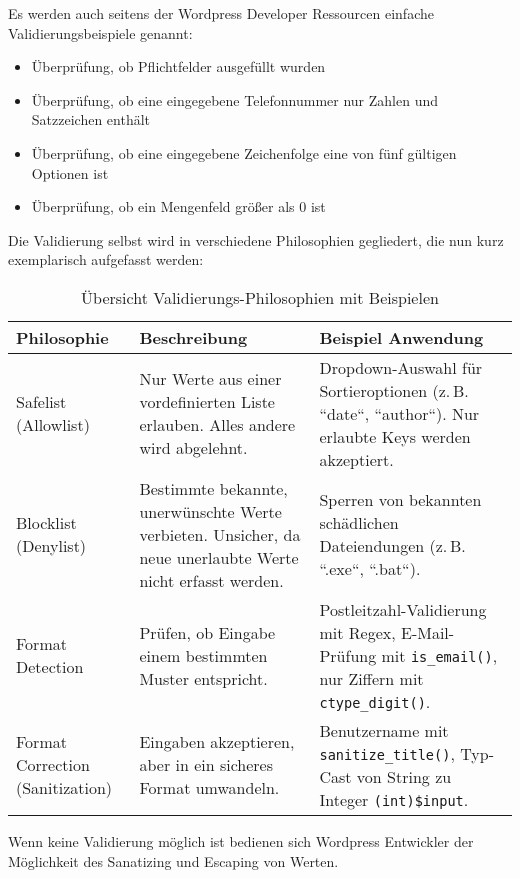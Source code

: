 Es werden auch seitens der Wordpress Developer Ressourcen einfache Validierungsbeispiele genannt:
\begin{itemize}
\item Überprüfung, ob Pflichtfelder ausgefüllt wurden
\item Überprüfung, ob eine eingegebene Telefonnummer nur Zahlen und Satzzeichen enthält
\item Überprüfung, ob eine eingegebene Zeichenfolge eine von fünf gültigen Optionen ist
\item Überprüfung, ob ein Mengenfeld größer als 0 ist
\end{itemize}
Die Validierung selbst wird in verschiedene Philosophien gegliedert, die nun kurz exemplarisch aufgefasst werden:
\begin{table}[h]
 \centering
 \renewcommand{\arraystretch}{1.3}
 \begin{tabular}{|p{3cm}|p{5cm}|p{6cm}|}
  \hline
  \textbf{Philosophie} & \textbf{Beschreibung} & \textbf{Beispiel Anwendung} \\
  \hline
  Safelist \newline (Allowlist)
  & Nur Werte aus einer vordefinierten Liste erlauben. Alles andere wird abgelehnt.
  & Dropdown-Auswahl für Sortieroptionen (z.\,B. ``date``, ``author``). Nur erlaubte Keys werden akzeptiert. \\
  \hline
  Blocklist \newline (Denylist)
  & Bestimmte bekannte, unerwünschte Werte verbieten. Unsicher, da neue unerlaubte Werte nicht erfasst werden.
  & Sperren von bekannten schädlichen Dateiendungen (z.\,B. ``.exe``, ``.bat``). \\
  \hline
  Format Detection
  & Prüfen, ob Eingabe einem bestimmten Muster entspricht.
  & Postleitzahl-Validierung mit Regex, E-Mail-Prüfung mit \texttt{is\_email()}, nur Ziffern mit \texttt{ctype\_digit()}. \\
  \hline
  Format Correction (Sanitization)
  & Eingaben akzeptieren, aber in ein sicheres Format umwandeln.
  & Benutzername \newline mit \texttt{sanitize\_title()}, Typ-Cast von String zu Integer \texttt{(int)\$input}. \\
  \hline
 \end{tabular}
 \caption{Übersicht Validierungs-Philosophien mit Beispielen}
\end{table}

\newpage
Wenn keine Validierung möglich ist bedienen sich Wordpress Entwickler der Möglichkeit des Sanatizing und Escaping von Werten.

